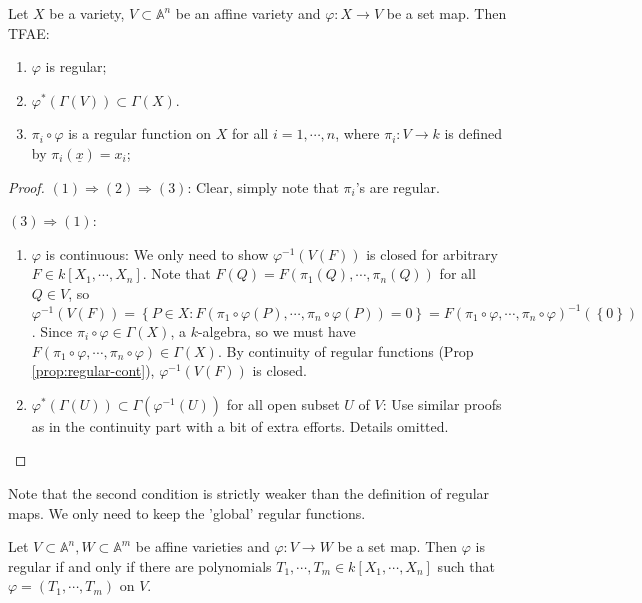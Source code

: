 \documentclass{note-eng}
\begin{document}
\begin{proposition} \label{prop:affine-regular-coordinate-poly}
    Let $X$ be a variety, $V \subset \mathbb{A}^n$ be an affine variety and $\varphi: X \rightarrow V$ be a set map. Then TFAE:
    \begin{enumerate}
        \item $\varphi$ is regular;
        \item $\varphi^\ast(\Gamma(V)) \subset \Gamma(X)$.
        \item $\pi_i \circ \varphi$ is a regular function on $X$ for all $i = 1, \cdots, n$, where $\pi_i: V \rightarrow k$ is defined by $\pi_i(\underline{x}) = x_i$;
    \end{enumerate}
\end{proposition}

\begin{proof}
    $(1) \Rightarrow (2) \Rightarrow (3)$: Clear, simply note that $\pi_i$'s are regular.

    $(3) \Rightarrow (1)$:
    \begin{enumerate}
        \item $\varphi$ is continuous: We only need to show $\varphi ^{-1}(V(F))$ is closed for arbitrary $F \in k[X_1, \cdots, X_n]$. Note that $F(Q) = F(\pi_1(Q), \cdots, \pi_n(Q))$ for all $Q \in V$, so $\varphi ^{-1}(V(F)) = \left\lbrace P \in X: F(\pi_1 \circ \varphi(P), \cdots, \pi_n \circ \varphi(P)) = 0 \right\rbrace = F(\pi_1 \circ \varphi, \cdots, \pi_n \circ \varphi) ^{-1}(\left\lbrace 0 \right\rbrace)$. Since $\pi_i \circ \varphi \in \Gamma(X)$, a $k$-algebra, so we must have $F (\pi_1 \circ \varphi, \cdots, \pi_n \circ \varphi) \in \Gamma(X)$. By continuity of regular functions (Prop \ref{prop:regular-cont}), $\varphi ^{-1}(V(F))$ is closed.
        \item $\varphi^\ast(\Gamma(U)) \subset \Gamma(\varphi ^{-1}(U))$ for all open subset $U$ of $V$: Use similar proofs as in the continuity part with a bit of extra efforts. Details omitted.
    \end{enumerate}
\end{proof}

Note that the second condition is strictly weaker than the definition of regular maps. We only need to keep the 'global' regular functions.

\begin{corollary}
    Let $V \subset \mathbb{A}^n, W \subset \mathbb{A}^m$ be affine varieties and $\varphi: V \rightarrow W$ be a set map. Then $\varphi$ is regular if and only if there are polynomials $T_1, \cdots, T_m \in k[X_1, \cdots, X_n]$ such that $\varphi = (T_1, \cdots, T_m)$ on $V$.
\end{corollary}
\end{document}

